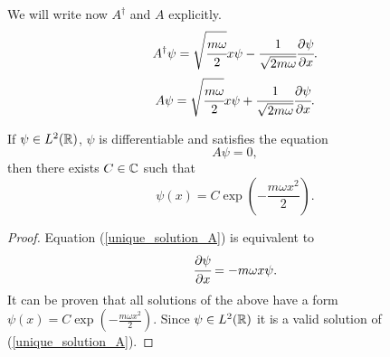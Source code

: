 \documentclass[main.tex]{subfiles}
\begin{document}
We will write now $A^\dag$ and $A$ explicitly.
\begin{equation}
A^\dag \psi = \sqrt{\cfrac{m\omega}{2}}x\psi - \cfrac{1}{\sqrt{2m\omega}}\cfrac{\partial\psi}{\partial x}.
\end{equation}
\begin{equation}
A \psi = \sqrt{\cfrac{m\omega}{2}}x\psi + \cfrac{1}{\sqrt{2m\omega}}\cfrac{\partial\psi}{\partial x}.
\end{equation}
\begin{fact}
If $\psi \in L^2(\mathbb{R})$, $\psi$ is differentiable and  satisfies the equation
\begin{equation}
\label{unique_solution_A}
    A\psi = 0,
\end{equation}
then there exists $C\in \mathbb{C}$ such that
\begin{equation}
    \psi(x) = C\exp(-\frac{m \omega x^2}{2}).
\end{equation}
\end{fact}
\begin{proof}
Equation (\ref{unique_solution_A}) is equivalent to
\begin{equation}
    \cfrac{\partial \psi}{\partial x} = - m\omega x \psi.
\end{equation}
It can be proven that all solutions of the above have a form $\psi(x) = C\exp(-\frac{m\omega x^2}{2})$. Since $\psi\in L^2(\mathbb{R})$ it is a valid solution of (\ref{unique_solution_A}).
\end{proof}
\end{document}
